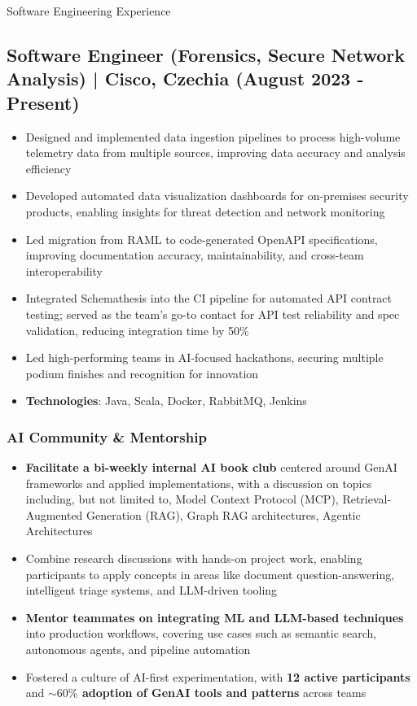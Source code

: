 \documentclass{resume} %
\begin{document}
\begin{rSection}{Software Engineering Experience}

    \subsection*{Software Engineer (Forensics, Secure Network Analysis) | Cisco, Czechia (August 2023 - Present)}
        \begin{itemize}
            \item Designed and implemented data ingestion pipelines to process high-volume telemetry data from multiple sources, improving data accuracy and analysis efficiency
            \item Developed automated data visualization dashboards for on-premises security products, enabling insights for threat detection and network monitoring
            \item Led migration from RAML to code-generated OpenAPI specifications, improving documentation accuracy, maintainability, and cross-team interoperability
            \item Integrated Schemathesis into the CI pipeline for automated API contract testing; served as the team’s go-to contact for API test reliability and spec validation, reducing integration time by 50\%
            \item Led high-performing teams in AI-focused hackathons, securing multiple podium finishes and recognition for innovation
            \item \textbf{Technologies}: Java, Scala, Docker, RabbitMQ, Jenkins
        \end{itemize}
        
        \subsubsection*{AI Community \& Mentorship}
        \begin{itemize}
            \item \textbf{Facilitate a bi-weekly internal AI book club} centered around GenAI frameworks and applied implementations, with a discussion on topics including, but not limited to, Model Context Protocol (MCP), Retrieval-Augmented Generation (RAG), Graph RAG architectures, Agentic Architectures
            \item Combine research discussions with hands-on project work, enabling participants to apply concepts in areas like document question-answering, intelligent triage systems, and LLM-driven tooling
            \item \textbf{Mentor teammates on integrating ML and LLM-based techniques} into production workflows, covering use cases such as semantic search, autonomous agents, and pipeline automation
            \item Fostered a culture of AI-first experimentation, with \textbf{12 active participants} and \textbf{\(\sim 60\%\) adoption of GenAI tools and patterns} across teams
        \end{itemize}


\end{rSection}
\end{document}
